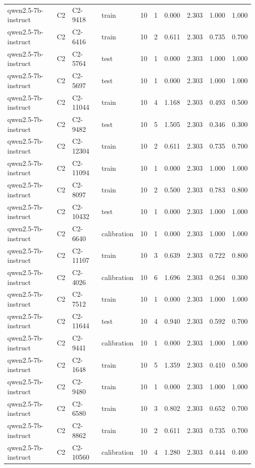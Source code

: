 \begin{table}
\begin{tabular}{llllrrrrrr}
qwen2.5-7b-instruct & C2 & C2-9418 & train & 10 & 1 & 0.000 & 2.303 & 1.000 & 1.000 \\
qwen2.5-7b-instruct & C2 & C2-6416 & train & 10 & 2 & 0.611 & 2.303 & 0.735 & 0.700 \\
qwen2.5-7b-instruct & C2 & C2-5764 & test & 10 & 1 & 0.000 & 2.303 & 1.000 & 1.000 \\
qwen2.5-7b-instruct & C2 & C2-5697 & test & 10 & 1 & 0.000 & 2.303 & 1.000 & 1.000 \\
qwen2.5-7b-instruct & C2 & C2-11044 & train & 10 & 4 & 1.168 & 2.303 & 0.493 & 0.500 \\
qwen2.5-7b-instruct & C2 & C2-9482 & test & 10 & 5 & 1.505 & 2.303 & 0.346 & 0.300 \\
qwen2.5-7b-instruct & C2 & C2-12304 & train & 10 & 2 & 0.611 & 2.303 & 0.735 & 0.700 \\
qwen2.5-7b-instruct & C2 & C2-11094 & train & 10 & 1 & 0.000 & 2.303 & 1.000 & 1.000 \\
qwen2.5-7b-instruct & C2 & C2-8097 & train & 10 & 2 & 0.500 & 2.303 & 0.783 & 0.800 \\
qwen2.5-7b-instruct & C2 & C2-10432 & test & 10 & 1 & 0.000 & 2.303 & 1.000 & 1.000 \\
qwen2.5-7b-instruct & C2 & C2-6640 & calibration & 10 & 1 & 0.000 & 2.303 & 1.000 & 1.000 \\
qwen2.5-7b-instruct & C2 & C2-11107 & train & 10 & 3 & 0.639 & 2.303 & 0.722 & 0.800 \\
qwen2.5-7b-instruct & C2 & C2-4026 & calibration & 10 & 6 & 1.696 & 2.303 & 0.264 & 0.300 \\
qwen2.5-7b-instruct & C2 & C2-7512 & train & 10 & 1 & 0.000 & 2.303 & 1.000 & 1.000 \\
qwen2.5-7b-instruct & C2 & C2-11644 & test & 10 & 4 & 0.940 & 2.303 & 0.592 & 0.700 \\
qwen2.5-7b-instruct & C2 & C2-9441 & calibration & 10 & 1 & 0.000 & 2.303 & 1.000 & 1.000 \\
qwen2.5-7b-instruct & C2 & C2-1648 & train & 10 & 5 & 1.359 & 2.303 & 0.410 & 0.500 \\
qwen2.5-7b-instruct & C2 & C2-9480 & train & 10 & 1 & 0.000 & 2.303 & 1.000 & 1.000 \\
qwen2.5-7b-instruct & C2 & C2-6580 & train & 10 & 3 & 0.802 & 2.303 & 0.652 & 0.700 \\
qwen2.5-7b-instruct & C2 & C2-8862 & train & 10 & 2 & 0.611 & 2.303 & 0.735 & 0.700 \\
qwen2.5-7b-instruct & C2 & C2-10560 & calibration & 10 & 4 & 1.280 & 2.303 & 0.444 & 0.400 \\

\end{tabular}
\end{table}
